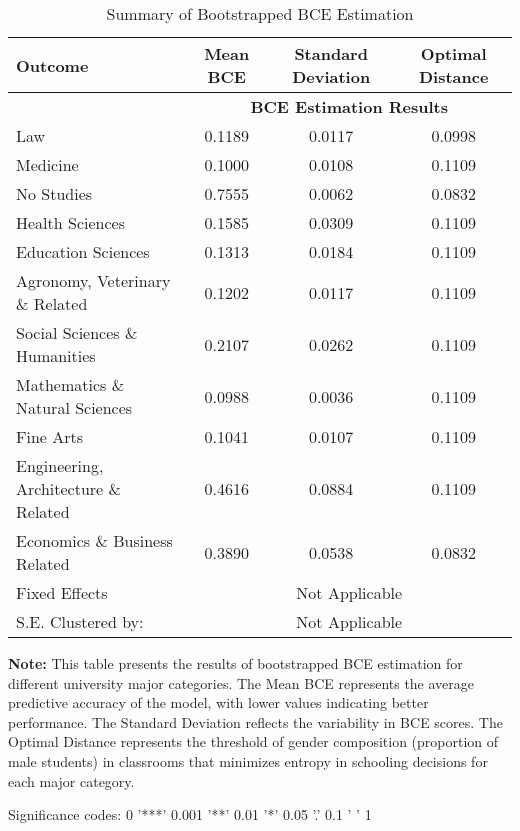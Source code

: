 \begin{table}[H]
\centering
\caption{Summary of Bootstrapped BCE Estimation}
\label{tab:summary_bce}
\begin{tabular}{lccc}
\toprule
Outcome                              & Mean BCE & Standard Deviation & Optimal Distance \\ \hline
& \multicolumn{3}{c}{\textbf{BCE Estimation Results}} \\

\midrule
Law & 0.1189 & 0.0117 & 0.0998 \\
Medicine & 0.1000 & 0.0108 & 0.1109 \\
No Studies & 0.7555 & 0.0062 & 0.0832 \\
Health Sciences & 0.1585 & 0.0309 & 0.1109 \\
Education Sciences & 0.1313 & 0.0184 & 0.1109 \\
Agronomy, Veterinary \& Related & 0.1202 & 0.0117 & 0.1109 \\
Social Sciences \& Humanities & 0.2107 & 0.0262 & 0.1109 \\
Mathematics \& Natural Sciences & 0.0988 & 0.0036 & 0.1109 \\
Fine Arts & 0.1041 & 0.0107 & 0.1109 \\
Engineering, Architecture \& Related & 0.4616 & 0.0884 & 0.1109 \\
Economics \& Business Related & 0.3890 & 0.0538 & 0.0832 \\
\hline
\hline
Fixed Effects & \multicolumn{3}{c}{Not Applicable} \\  
S.E. Clustered by: & \multicolumn{3}{c}{Not Applicable} \\
\bottomrule
\end{tabular}
\begin{threeparttable}
\begin{tablenotes}
\small
\item \textbf{Note:} This table presents the results of bootstrapped BCE estimation for different university major categories. The Mean BCE represents the average predictive accuracy of the model, with lower values indicating better performance. The Standard Deviation reflects the variability in BCE scores. The Optimal Distance represents the threshold of gender composition (proportion of male students) in classrooms that minimizes entropy in schooling decisions for each major category.
\item Significance codes: 0 '***' 0.001 '**' 0.01 '*' 0.05 '.' 0.1 ' ' 1
\end{tablenotes}
\end{threeparttable}
\end{table}